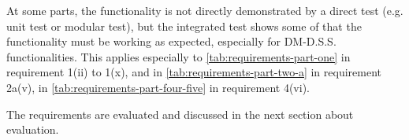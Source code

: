At some parts, the functionality is not directly demonstrated by a direct test (e.g. unit test or modular test), but the integrated test shows some of that the functionality must be working as expected, especially for DM-D.S.S. functionalities. This applies especially to \autoref{tab:requirements-part-one} in requirement 1(ii) to 1(x), and in \autoref{tab:requirements-part-two-a} in requirement 2a(v), in \autoref{tab:requirements-part-four-five} in requirement 4(vi).

The requirements are evaluated and discussed in the next section about evaluation.